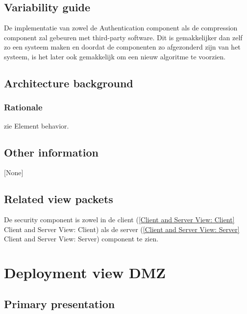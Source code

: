 \documentclass[a4paper,10pt]{article}
\begin{document}
\subsection{Variability guide}
De implementatie van zowel de Authentication component als de compression component zal gebeuren met third-party software. Dit is gemakkelijker dan zelf zo een systeem maken en doordat de componenten zo afgezonderd zijn van het systeem, is het later ook gemakkelijk om een nieuw algoritme te voorzien.\\

\subsection{Architecture background}

\subsubsection{Rationale}
zie Element behavior.


\subsection{Other information}
[None]

\subsection{Related view packets}
De security component is zowel in de client (\ref{Client and Server View: Client} Client and Server View: Client) als de server (\ref{Client and Server View: Server} Client and Server View: Server) component te zien.


\clearpage
\section{Deployment view DMZ}
\label{sec:deploymentView:DMZ}

\subsection{Primary presentation}
\end{document}
